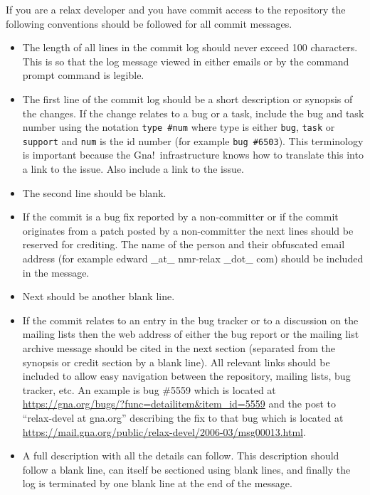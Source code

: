 If you are a relax developer and you have commit access to the repository the following conventions should be followed for all commit messages.
\begin{itemize}
  \item The length of all lines in the commit log should never exceed 100 characters.
    This is so that the log message viewed in either emails or by the command prompt command \mbox{} is legible.
  \item The first line of the commit log should be a short description or synopsis of the changes.
    If the change relates to a bug or a task, include the bug and task number using the notation \texttt{type \#num} where type is either \texttt{bug}, \texttt{task} or \texttt{support} and \texttt{num} is the id number (for example \texttt{bug \#6503}).
    This terminology is important because the Gna!\ infrastructure knows how to translate this into a link to the issue.
    Also include a link to the issue.
  \item The second line should be blank.
  \item If the commit is a bug fix reported by a non-committer or if the commit originates from a patch posted by a non-committer the next lines should be reserved for crediting.
    The name of the person and their obfuscated email address (for example edward \_at\_ nmr-relax \_dot\_ com) should be included in the message.
  \item Next should be another blank line.
  \item If the commit relates to an entry in the bug tracker or to a discussion on the mailing lists then the web address of either the bug report or the mailing list archive message should be cited in the next section (separated from the synopsis or credit section by a blank line).
    All relevant links should be included to allow easy navigation between the repository, mailing lists, bug tracker, etc.
    An example is bug \#5559 which is located at \href{https://gna.org/bugs/?func=detailitem\&item\_id=5559}{https://gna.org/bugs/?func=detailitem\&item\_id=5559} and the post to ``relax-devel at gna.org'' describing the fix to that bug which is located at \href{https://mail.gna.org/public/relax-devel/2006-03/msg00013.html}{https://mail.gna.org/public/relax-devel/2006-03/msg00013.html}.
  \item A full description with all the details can follow.
    This description should follow a blank line, can itself be sectioned using blank lines, and finally the log is terminated by one blank line at the end of the message.
\end{itemize}

